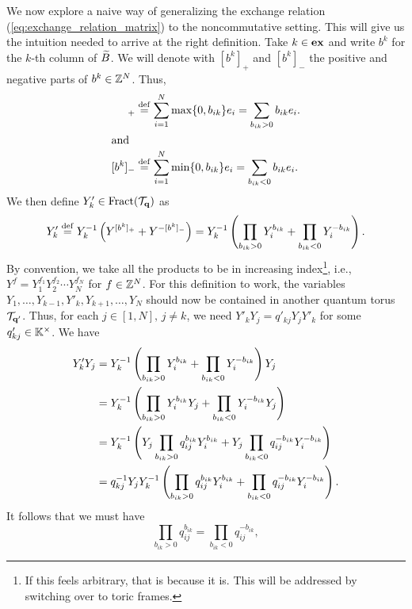 We now explore a naive way of generalizing the exchange relation
(\cref{eq:exchange_relation_matrix}) to the noncommutative setting. This will give us
the intuition needed to arrive at the right definition. Take $k \in \mathbf{ex}$ and write
$b^k$ for the $k$-th column of $\widetilde{B}$. We will denote with
$[b^k]_{+}$ and $[b^k]_{-}$ the positive and
negative parts of $b^k \in \mathbb{Z}^N$. Thus,
\begin{align*}
	[b^k]_{+} & \defeq \sum_{i=1}^N \max\{0, b_{ik}\}e_i = \sum_{b_{ik} > 0} b_{ik}e_i. \\
	\shortintertext{and}
	[b^k]_{-} & \defeq \sum_{i=1}^N \min\{0, b_{ik}\}e_i = \sum_{b_{ik} < 0} b_{ik}e_i.
\end{align*}
We then define $Y'_k \in \operatorname{Fract}(\mathcal{T}_{\mathbf{q}})$ as
\begin{equation}\label{eq:quantum_exchange_naive}
	Y_k' \overset{\mathrm{def}}{=} Y_k^{-1} \left(Y^{[b^k]_{+}} + Y^{-[b^k]_{-}}\right) = Y_k^{-1} \left(\prod_{b_{ik} > 0}Y_i^{b_{ik}} + \prod_{b_{ik} < 0} Y_i^{-b_{ik}}\right).
\end{equation}
%
By convention, we take all the products to be in increasing index\footnote{If this
	feels arbitrary, that is because it is. This will be addressed by switching over to
	toric frames.}, i.e., $Y^f = Y_1^{f_1}Y_2^{f_2} \cdots Y_N^{f_N}$ for $f \in \mathbb{Z}^N$.
For this definition to work, the variables $Y_1, \dots, Y_{k-1}, Y'_k, Y_{k+1}, \dots,
	Y_N$ should now be contained in another quantum torus $\mathcal{T}_{\mathbf{q}'}$. Thus, for each $j
	\in [1, N],\, j \neq k$, we need $Y'_k Y_j = q'_{kj} Y_j Y'_k$ for some $q'_{kj} \in
	\mathbb{K}^\times$. We have
\begin{align*}
	Y'_k Y_j
	 & = Y_k^{-1} \left(\prod_{b_{ik} > 0} Y_i^{b_{ik}} + \prod_{b_{ik} < 0}Y_i^{-b_{ik}}\right) Y_j                                             \\
	 & = Y_k^{-1} \left(\prod_{b_{ik} > 0} Y_i^{b_{ik}}Y_j + \prod_{b_{ik} < 0}Y_i^{-b_{ik}}Y_j\right)                                           \\
	 & = Y_k^{-1} \left(Y_j \prod_{b_{ik} > 0} q_{ij}^{b_{ik}} Y_i^{b_{ik}} + Y_j \prod_{b_{ik} < 0}q_{ij}^{-b_{ik}}Y_i^{-b_{ik}}\right)         \\
	 & = q_{kj}^{-1} Y_j Y_k^{-1} \left(\prod_{b_{ik} > 0} q_{ij}^{b_{ik}} Y_i^{b_{ik}} + \prod_{b_{ik} < 0}q_{ij}^{-b_{ik}}Y_i^{-b_{ik}}\right).
\end{align*}
%
It follows that we must have
\begin{equation}\label{eq:b_plus_is_b_minus}
	\prod_{b_{ik} > 0}q_{ij}^{b_{ik}} = \prod_{b_{ik} < 0}q_{ij}^{ - b_{ik}},
\end{equation}
